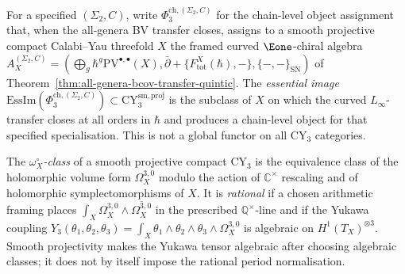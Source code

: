\begin{definition}
\label{def:phi3-ch-essential-image}
For a specified $(\Sigma_2,C)$, write $\Phi_3^{\mathrm{ch},(\Sigma_2,C)}$ for the chain-level object assignment that, when the all-genera BV transfer closes, assigns to a smooth projective compact Calabi--Yau threefold $X$ the framed curved $\Eone$-chiral algebra $A_X^{(\Sigma_2,C)} = (\bigoplus_g \hbar^g \mathrm{PV}^{\bullet,\bullet}(X), \bar\partial + \{F_{\mathrm{tot}}^X(\hbar), -\}, \{-,-\}_{\mathrm{SN}})$ of Theorem~\ref{thm:all-genera-bcov-transfer-quintic}. The \emph{essential image} $\mathrm{EssIm}(\Phi_3^{\mathrm{ch},(\Sigma_2,C)}) \subset \mathrm{CY}_3^{\mathrm{sm,proj}}$ is the subclass of $X$ on which the curved $L_\infty$-transfer closes at all orders in $\hbar$ and produces a chain-level object for that specified specialisation. This is not a global functor on all CY$_3$ categories.
\end{definition}

\begin{definition}
\label{def:omega-rational-class-phi3-ch}
The \emph{$\omega_X^\circ$-class} of a smooth projective compact CY$_3$ is the equivalence class of the holomorphic volume form $\Omega_X^{3,0}$ modulo the action of $\mathbb{C}^\times$ rescaling and of holomorphic symplectomorphisms of $X$. It is \emph{rational} if a chosen arithmetic framing places $\int_X \Omega_X^{3,0} \wedge \overline{\Omega_X^{3,0}}$ in the prescribed $\mathbb Q^\times$-line and if the Yukawa coupling $Y_3(\theta_1, \theta_2, \theta_3) = \int_X \theta_1 \wedge \theta_2 \wedge \theta_3 \wedge \Omega_X^{3,0}$ is algebraic on $H^1(T_X)^{\otimes 3}$. Smooth projectivity makes the Yukawa tensor algebraic after choosing algebraic classes; it does not by itself impose the rational period normalisation.
\end{definition}

